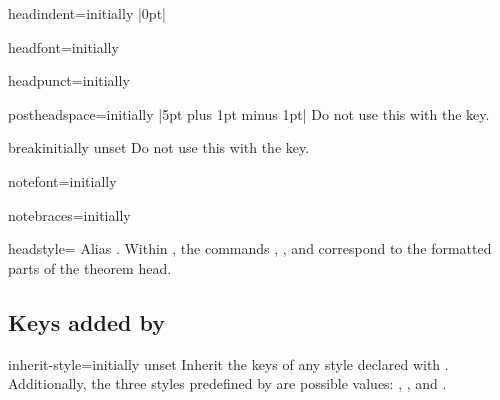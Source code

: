 \documentclass{ltxdoc}
\newcommand{\ttbraces}[1]{\braces{\texttt{#1}}}
\begin{document}
\begin{docKey}{headindent}{=}{initially |0pt|}

\end{docKey}

\begin{docKey}{headfont}{=}{initially }

\end{docKey}

\begin{docKey}{headpunct}{=}{initially \ttbraces{.}}

\end{docKey}

\begin{docKey}{postheadspace}{=}{initially |5pt plus 1pt minus 1pt|}
Do not use this with the  key.
\end{docKey}

\begin{docKey}{break}{}{initially unset}
Do not use this with the  key.
\end{docKey}

\begin{docKey}{notefont}{=}{initially }

\end{docKey}

\begin{docKey}{notebraces}{=}{initially \ttbraces{(}\ttbraces{)}}

\end{docKey}

\begin{docKey}{headstyle}{=\textbar{}\textbar{}}{}
Alias . Within , the commands , , and  correspond to the formatted parts of the theorem head.
\end{docKey}

\subsection{Keys added by }

\begin{docKey}{inherit-style}{=}{initially unset}
Inherit the keys of any style declared with . Additionally, the three styles predefined by  are possible values: , , and .
\end{docKey}
\end{document}

